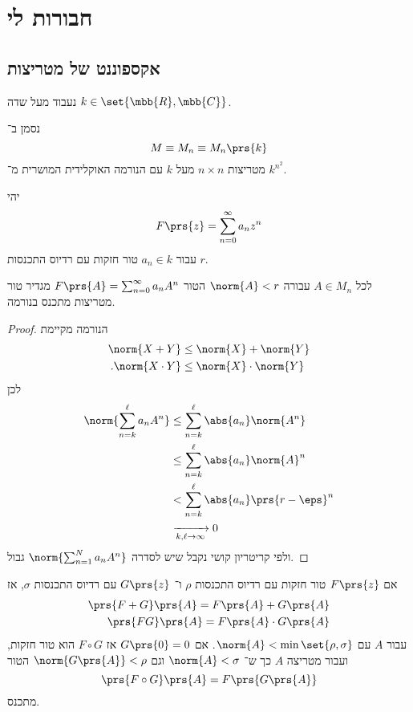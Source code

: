 \documentclass[10pt, twoside]{book}
\begin{document}
\section{חבורות לי}

\subsection{אקספוננט של מטריצות}

נעבוד מעל שדה
$k \in \set{\mbb{R}, \mbb{C}}$.

נסמן ב־%
\[M \equiv M_n \equiv M_n\prs{k}\]
מטריצות
$n \times n$
מעל
$k$
עם הנורמה האוקלידית המושרית מ־%
$k^{n^2}$.

\begin{proposition}
יהי
\[F\prs{z} = \sum_{n=0}^{\infty} a_n z^n\]
עבור
$a_n \in k$
טור חזקות עם רדיוס התכנסות
$r$.

לכל
$A \in M_n$
עבורה
$\norm{A} < r$
הטור
$F\prs{A} = \sum_{n=0}^{\infty} a_n A^n$
מגדיר טור מטריצות מתכנס בנורמה.
\end{proposition}

\begin{proof}
הנורמה מקיימת
\begin{align*}
\norm{X+Y} &\leq \norm{X} + \norm{Y} \\
\text{.} \norm{X \cdot Y} &\leq \norm{X} \cdot \norm{Y}
\end{align*}
לכן
\begin{align*}
\norm{\sum_{n=k}^\ell a_n A^n} &\leq \sum_{n=k}^\ell \abs{a_n}\norm{A^n}
\\&\leq
\sum_{n=k}^\ell \abs{a_n}\norm{A}^n
\\&<
\sum_{n=k}^\ell \abs{a_n}\prs{r-\eps}^n
\\&\xrightarrow[k,\ell \to \infty]{} 0
\end{align*}
ולפי קריטריון קושי נקבל שיש לסדרה
$\norm{\sum_{n=1}^N a_n A^n}$
גבול.
\end{proof}

אם
$F\prs{z}$
טור חזקות עם רדיוס התכנסות
$\rho$
ו־%
$G\prs{z}$
עם רדיוס התכנסות
$\sigma$,
אז
\begin{align*}
\prs{F+G}\prs{A} = F\prs{A} + G\prs{A} \\
\prs{FG}\prs{A} = F\prs{A} \cdot G\prs{A}
\end{align*}
עבור
$A$
עם
$\norm{A} < \min\set{\rho,\sigma}$.
אם
$G\prs{0} = 0$
אז
$F \circ G$
הוא טור חזקות, ועבור מטריצה
$A$
כך ש־%
$\norm{A} < \sigma$
וגם
$\norm{G\prs{A}} < \rho$
הטור
\[\prs{F \circ G}\prs{A} = F\prs{G\prs{A}}\]
מתכנס.
\end{document}
